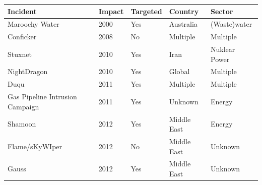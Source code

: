 \documentclass[runningheads]{llncs}
\begin{document}
\begin{table}[h]
    \label{tab:incidents}
	\centering
    \begin{tabular}{|l|l|l|l|l|}
    \hline
    \textbf{Incident}               & \multicolumn{1}{l|}{\textbf{Impact}} & \multicolumn{1}{l|}{\textbf{Targeted}} & \multicolumn{1}{l|}{\textbf{Country}} & \textbf{Sector} \\ \hline
    Maroochy Water                  & 2000                                       & Yes                                    & Australia                                    & (Waste)water                         \\
    Conficker                       & 2008                                       & No                                     & Multiple                              & Multiple                             \\
    Stuxnet                         & 2010                                       & Yes                                    & Iran                                         & Nuklear Power                        \\
    NightDragon                     & 2010                                       & Yes                                    & Global                                       & Multiple                             \\
    Duqu                            & 2011                                       & Yes                                    & Multiple                                     & Multiple                            \\
    Gas Pipeline Intrusion Campaign & 2011                                       & Yes                                    & Unknown                                            & Energy                               \\
    Shamoon                         & 2012                                       & Yes                                    & Middle East                                  & Energy                               \\
    Flame/sKyWIper                  & 2012                                       & No                                     & Middle East                                  & Unknown                                    \\
    Gauss                           & 2012                                       & Yes                                    & Middle East                                  & Unknown                                    \\

\end{tabular}
\end{table}
\end{document}
